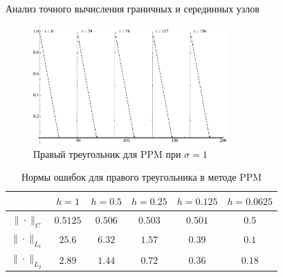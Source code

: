 \documentclass[unicode, 8pt]{beamer}
\begin{document}
    \begin{frame}{Анализ точного вычисления граничных и серединных узлов}
        \begin{figure}[h]
            \centering
            \includegraphics[width=0.66\textwidth]{sigma=1./advectionPPM_rightTriangle.pdf}
            \caption{Правый треугольник для PPM при $ \sigma = 1 $}
            \label{fig:ppm_rightTriangle_1}
        \end{figure}
        \begin{table}[h]
            \centering
            \begin{tabular}{ |c|c|c|c|c|c| } 
             \hline
              & $ h=1 $ &  $ h=0.5$ &  $ h=0.25 $ &  $ h=0.125 $ &  $ h=0.0625 $ \\ 
             \hline
             $\| \cdot \|_{C}$ & $0.5125$ & $0.506$ & $0.503$ & $0.501$ & $0.5$
             \\
             \hline
             $\| \cdot \|_{L_1}$ & $25.6$ & $6.32$ & $1.57$ & $0.39$ & $0.1$
             \\
             \hline
             $\| \cdot \|_{L_2}$ & $2.89$ & $1.44$ & $0.72$ & $0.36$ & $0.18$ \\
             \hline 
            \end{tabular}
            \\[0.1em]
            \caption{Нормы ошибок для правого треугольника в методе PPM}
            \label{table:ltPPM}
        \end{table}
    \end{frame}
\end{document}
